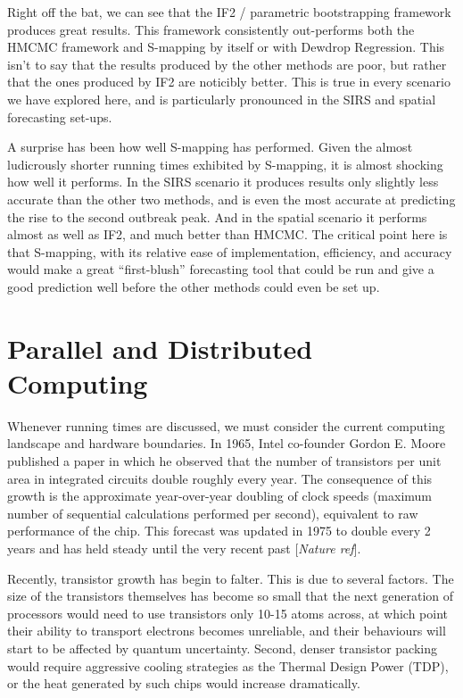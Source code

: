 	Right off the bat, we can see that the IF2 / parametric bootstrapping framework produces great results. This framework consistently out-performs both the HMCMC framework and S-mapping by itself or with Dewdrop Regression. This isn't to say that the results produced by the other methods are poor, but rather that the ones produced by IF2 are noticibly better. This is true in every scenario we have explored here, and is particularly pronounced in the SIRS and spatial forecasting set-ups.

	A surprise has been how well S-mapping has performed. Given the almost ludicrously shorter running times exhibited by S-mapping, it is almost shocking how well it performs. In the SIRS scenario it produces results only slightly less accurate than the other two methods, and is even the most accurate at predicting the rise to the second outbreak peak. And in the spatial scenario it performs almost as well as IF2, and much better than HMCMC. The critical point here is that S-mapping, with its relative ease of implementation, efficiency, and accuracy would make a great ``first-blush'' forecasting tool that could be run and give a good prediction well before the other methods could even be set up.


\section{Parallel and Distributed Computing}

	Whenever running times are discussed, we must consider the current computing landscape and hardware boundaries. In 1965, Intel co-founder Gordon E. Moore published a paper in which he observed that the number of transistors per unit area in integrated circuits double roughly every year. The consequence of this growth is the approximate year-over-year doubling of clock speeds (maximum number of sequential calculations performed per second), equivalent to raw performance of the chip. This forecast was updated in 1975 to double every 2 years and has held steady until the very recent past [\textit{Nature ref}].

	Recently, transistor growth has begin to falter. This is due to several factors. The size of the transistors themselves has become so small that the next generation of processors would need to use transistors only 10-15 atoms across, at which point their ability to transport electrons becomes unreliable, and their behaviours will start to be affected by quantum uncertainty. Second, denser transistor packing would require aggressive cooling strategies as the Thermal Design Power (TDP), or the heat generated by such chips would increase dramatically.

